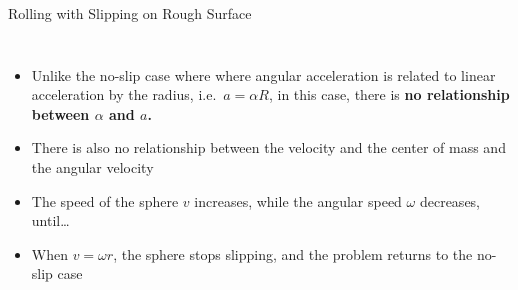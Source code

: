 \documentclass[12pt,compress,aspectratio=169]{beamer}
\begin{document}
\begin{frame}{Rolling with Slipping on Rough Surface}
  \begin{columns}

    \begin{itemize}
    \item Unlike the no-slip case where where angular acceleration is related
      to linear acceleration by the radius, i.e.\ $a=\alpha R$, in this case,
      there is \textbf{no relationship between $\alpha$ and $a$.}
    \item There is also no relationship between the velocity and the center
      of mass and the angular velocity
    \item The speed of the sphere $v$ increases, while the angular speed
      $\omega$ decreases, until\ldots
    \item When $v=\omega r$, the sphere stops slipping, and the problem returns
      to the no-slip case
    \end{itemize}
  \end{columns}
\end{frame}
\end{document}
